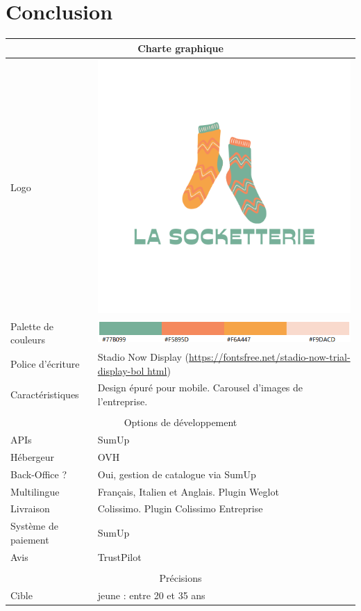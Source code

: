 \documentclass[a4paper, 12pt]{article}
\begin{document}
\section{Conclusion}
\begin{tabularx}{\linewidth}{|l|X|}
\hline
\multicolumn{2}{|c|}{Charte graphique}\\
\hline
Logo & \includegraphics[scale=0.3]{La socketterie.png}\\
\hline
Palette de couleurs & \includegraphics[scale=0.6]{palette_couleur.png}\\
\hline
Police d'écriture & Stadio Now Display (\url{https://fontsfree.net/stadio-now-trial-display-bol
html})\\
\hline
Caractéristiques & Design épuré pour mobile. Carousel d'images de l'entreprise.\\
\hline
\multicolumn{2}{c}{}\\
\hline
\multicolumn{2}{|c|}{Options de développement}\\
\hline
APIs & SumUp\\
\hline
Hébergeur & OVH\\
\hline
Back-Office ? & Oui, gestion de catalogue via SumUp\\
\hline
Multilingue & Français, Italien et Anglais. Plugin Weglot\\
\hline
Livraison & Colissimo. Plugin Colissimo Entreprise\\
\hline
Système de paiement & SumUp\\
\hline
Avis & TrustPilot\\
\hline
\multicolumn{2}{c}{}\\
\hline
\multicolumn{2}{|c|}{Précisions}\\
\hline
Cible & jeune : entre 20 et 35 ans\\
\hline
\end{tabularx}
\end{document}
